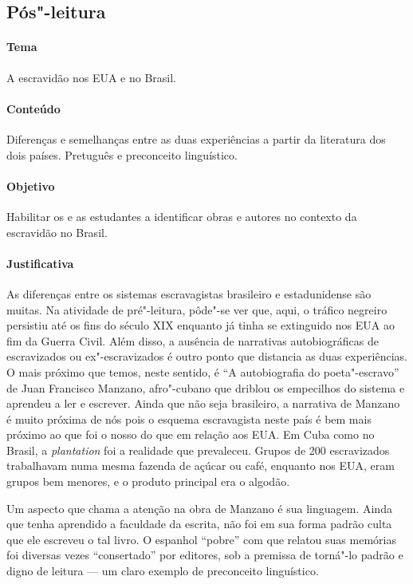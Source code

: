 \documentclass[11pt]{extarticle}
\begin{document}
\begin{enumerate}
\begin{enumerate}
\subsection{Pós"-leitura}


\paragraph{Tema} A escravidão nos EUA e no Brasil.

\paragraph{Conteúdo} Diferenças e semelhanças entre as duas experiências a partir da
literatura dos dois países. Pretuguês e preconceito linguístico.

\paragraph{Objetivo} Habilitar os e as estudantes a identificar obras e autores no contexto
da escravidão no Brasil. 

\paragraph{Justificativa} As diferenças entre os sistemas escravagistas brasileiro e estadunidense são
muitas. Na atividade de pré"-leitura, pôde"-se ver que, aqui, o tráfico negreiro persistiu até
os fins do século \textsc{XIX} enquanto já tinha se extinguido nos EUA ao fim da Guerra Civil. 
Além disso, a ausência de narrativas autobiográficas de escravizados ou ex"-escravizados é outro
ponto que distancia as duas experiências. O mais próximo que temos, neste sentido, 
é ``A autobiografia do poeta"-escravo'' de Juan Francisco Manzano, afro"-cubano que driblou
os empecilhos do sistema e aprendeu a ler e escrever. Ainda que não seja brasileiro,
a narrativa de Manzano é muito próxima de nós pois o esquema escravagista neste país é bem
mais próximo ao que foi o nosso do que em relação aos EUA. Em Cuba como no Brasil, a 
\textit{plantation} foi a realidade que prevaleceu. Grupos de 200 escravizados trabalhavam numa
mesma fazenda de açúcar ou café, enquanto nos EUA, eram grupos bem menores, e o produto
principal era o algodão. 

Um aspecto que chama a atenção na obra de Manzano é sua linguagem. Ainda que tenha aprendido
a faculdade da escrita, não foi em sua forma padrão culta que ele escreveu o tal livro.
O espanhol ``pobre'' com que relatou suas memórias foi diversas vezes ``consertado'' por
editores, sob a premissa de torná"-lo padrão e digno de leitura --- um claro exemplo
de preconceito linguístico.


\end{enumerate}
\end{enumerate}
\end{document}
